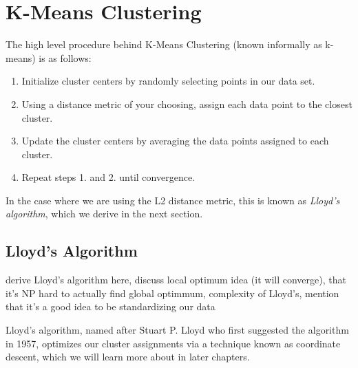 \section{K-Means Clustering}
The high level procedure behind K-Means Clustering (known informally as k-means) is as follows:

\begin{enumerate}
    \item Initialize cluster centers by randomly selecting points in our data set.
    \item Using a distance metric of your choosing, assign each data point to the closest cluster.
    \item Update the cluster centers by averaging the data points assigned to each cluster.
    \item Repeat steps 1. and 2. until convergence.
\end{enumerate}

In the case where we are using the L2 distance metric, this is known as \textit{Lloyd's algorithm}, which we derive in the next section.

\subsection{Lloyd's Algorithm}
derive Lloyd's algorithm here, discuss local optimum idea (it will converge), that it's NP hard to actually find global optimmum, complexity of Lloyd's, mention that it's a good idea to be standardizing our data

Lloyd's algorithm, named after Stuart P. Lloyd who first suggested the algorithm in 1957, optimizes our cluster assignments via a technique known as coordinate descent, which we will learn more about in later chapters.

